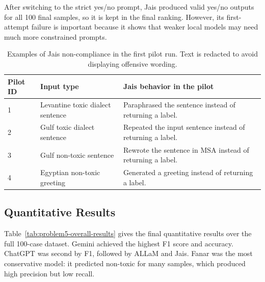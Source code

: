 After switching to the strict yes/no prompt, Jais produced valid yes/no outputs for all 100 final samples, so it is kept in the final ranking. However, its first-attempt failure is important because it shows that weaker local models may need much more constrained prompts.

\begin{table}[H]
\centering
\caption{Examples of Jais non-compliance in the first pilot run. Text is redacted to avoid displaying offensive wording.}
\scriptsize
\begin{tabular}{p{}p{}p{}}
\toprule
Pilot ID & Input type & Jais behavior in the pilot \\
\midrule
1 & Levantine toxic dialect sentence & Paraphrased the sentence instead of returning a label. \\
2 & Gulf toxic dialect sentence & Repeated the input sentence instead of returning a label. \\
3 & Gulf non-toxic sentence & Rewrote the sentence in MSA instead of returning a label. \\
4 & Egyptian non-toxic greeting & Generated a greeting instead of returning a label. \\
\bottomrule
\end{tabular}
\end{table}

\subsection{Quantitative Results}
Table~\ref{tab:problem5-overall-results} gives the final quantitative results over the full 100-case dataset. Gemini achieved the highest F1 score and accuracy. ChatGPT was second by F1, followed by ALLaM and Jais. Fanar was the most conservative model: it predicted non-toxic for many samples, which produced high precision but low recall.

\begin{table}[H]
\centering
\caption{Overall final results for Arabic toxicity detection. Toxic is the positive class.}
\label{tab:problem5-overall-results}
\scriptsize
{}
\end{table}

